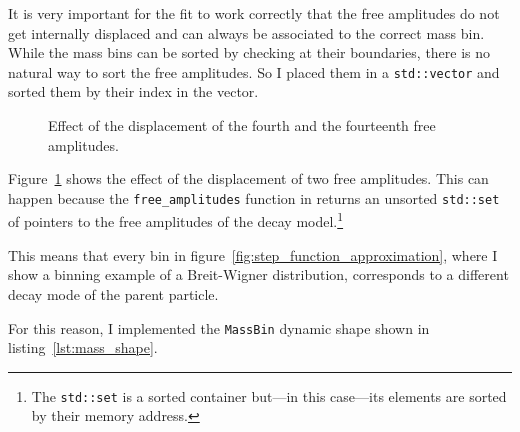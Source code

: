     
    It is very important for the fit to work correctly that the free amplitudes do not get internally displaced and can always be associated to the correct mass bin.
    While the mass bins can be sorted by checking at their boundaries, there is no natural way to sort the free amplitudes.
    So I placed them in a \lstinline!std::vector! and sorted them by their index in the vector.
    \begin{figure}
        \centering
        \subfloat[][]{}

        \subfloat[][]{}

        \caption{Effect of the displacement of the fourth and the fourteenth free amplitudes.}
        \label{fig:bw_binning_displaced}
    \end{figure}
    Figure~\ref{fig:bw_binning_displaced} shows the effect of the displacement of two free amplitudes.
    This can happen because the \lstinline!free_amplitudes! function in  returns an unsorted \lstinline!std::set! of pointers to the free amplitudes of the decay model.\footnote{The \lstinline!std::set! is a sorted container but---in this case---its elements are sorted by their memory address.}

    



    This means that every bin in figure~\ref{fig:step_function_approximation}, where I show a binning example of a Breit-Wigner distribution, corresponds to a different decay mode of the parent particle.


    For this reason, I implemented the \lstinline!MassBin! dynamic shape shown in listing~\ref{lst:mass_shape}.
